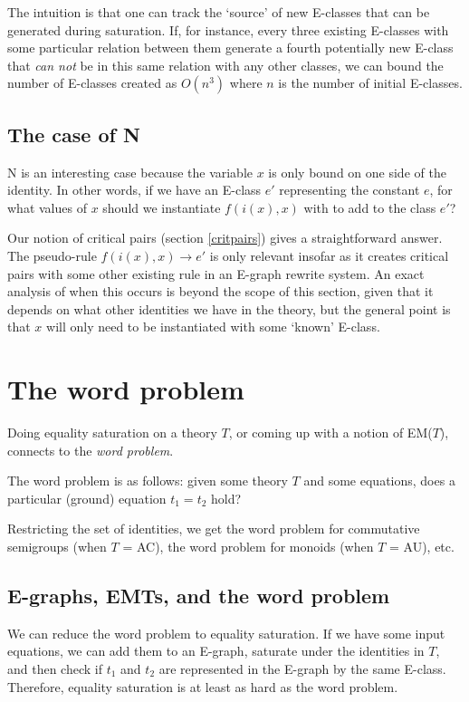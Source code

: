 \documentclass[12pt,a4paper,twoside,openright]{report}
\numberwithin{equation}{chapter}		%
\numberwithin{figure}{chapter}			%
\numberwithin{table}{chapter}			%
\theoremstyle{definition}
\theoremstyle{plain}
\begin{document}
The intuition is that one can track the `source' of new E-classes that can be generated during saturation. If, for instance, every three existing E-classes with some particular relation between them generate a fourth potentially new E-class that \emph{can not} be in this same relation with any other classes, we can bound the number of E-classes created as $O(n^3)$ where $n$ is the number of initial E-classes.

\subsection{The case of N}
N is an interesting case because the variable $x$ is only bound on one side of the identity. In other words, if we have an E-class $e'$ representing the constant $e$, for what values of $x$ should we instantiate $f(i(x), x)$ with to add to the class $e'$?

Our notion of critical pairs (section \ref{critpairs}) gives a straightforward answer. The pseudo-rule $f(i(x), x) \rightarrow e'$ is only relevant insofar as it creates critical pairs with some other existing rule in an E-graph rewrite system. An exact analysis of when this occurs is beyond the scope of this section, given that it depends on what other identities we have in the theory, but the general point is that $x$ will only need to be instantiated with some `known' E-class.

\section{The word problem}
Doing equality saturation on a theory $T$, or coming up with a notion of EM($T$), connects to the \emph{word problem}.

The word problem is as follows: given some theory $T$ and some equations, does a particular (ground) equation $t_1 = t_2$ hold?

Restricting the set of identities, we get the word problem for commutative semigroups (when $T$ = AC), the word problem for monoids (when $T$ = AU), etc.

\subsection{E-graphs, EMTs, and the word problem}

We can reduce the word problem to equality saturation. If we have some input equations, we can add them to an E-graph, saturate under the identities in $T$, and then check if $t_1$ and $t_2$ are represented in the E-graph by the same E-class. Therefore, equality saturation is at least as hard as the word problem.
\end{document}
